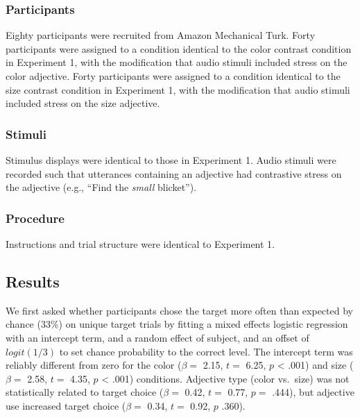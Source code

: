 \documentclass[10pt, letterpaper]{article}
\begin{document}
\subsubsection{Participants}\label{participants-1}

Eighty participants were recruited from Amazon Mechanical Turk. Forty
participants were assigned to a condition identical to the color
contrast condition in Experiment 1, with the modification that audio
stimuli included stress on the color adjective. Forty participants were
assigned to a condition identical to the size contrast condition in
Experiment 1, with the modification that audio stimuli included stress
on the size adjective.

\subsubsection{Stimuli}\label{stimuli-1}

Stimulus displays were identical to those in Experiment 1. Audio stimuli
were recorded such that utterances containing an adjective had
contrastive stress on the adjective (e.g., ``Find the \emph{small}
blicket'').

\subsubsection{Procedure}\label{procedure-1}

Instructions and trial structure were identical to Experiment 1.

\subsection{Results}\label{results-2}

We first asked whether participants chose the target more often than
expected by chance (\(33\%\)) on unique target trials by fitting a mixed
effects logistic regression with an intercept term, and a random effect
of subject, and an offset of \(logit(1/3)\) to set chance probability to
the correct level. The intercept term was reliably different from zero
for the color (\(\beta =\) 2.15, \(t =\) 6.25, \(p\) \textless{} .001)
and size (\(\beta =\) 2.58, \(t =\) 4.35, \(p\) \textless{} .001)
conditions. Adjective type (color vs.~size) was not statistically
related to target choice (\(\beta =\) 0.42, \(t =\) 0.77, \(p =\) .444),
but adjective use increased target choice (\(\beta =\) 0.34, \(t =\)
0.92, \(p\) .360).
\end{document}
